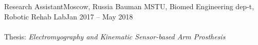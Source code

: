 \resumeSubheading
{Research Assistant}{Moscow, Russia}
{Bauman MSTU, Biomed Engineering dep-t, Robotic Rehab Lab}{Jan 2017 -- May 2018}
{\ \ \ \\}\\
{Thesis: \textit{Electromyography and Kinematic Sensor-based Arm Prosthesis}}